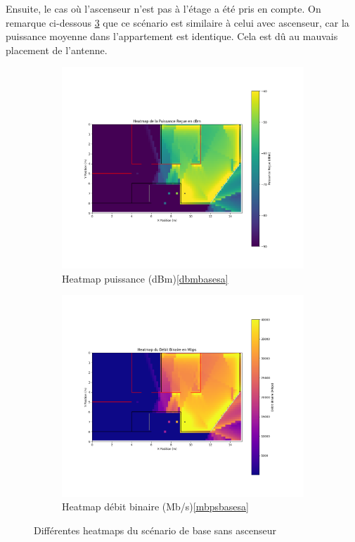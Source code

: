 Ensuite, le cas où l'ascenseur n'est pas à l'étage a été pris en compte. On remarque ci-dessous \ref{okemec} que ce scénario est similaire à celui avec ascenseur, car la puissance moyenne dans l'appartement est identique. Cela est dû au mauvais placement de l'antenne.

\begin{figure}[H]
\centering
\begin{subfigure}[b]{0.48\textwidth}
    \centering
    \includegraphics[width=\textwidth]{Pictures/bpmsa.png}
    \caption{Heatmap puissance (dBm)\ref{dbmbasesa}}
    \label{fig:}
\end{subfigure}
\hfill
\begin{subfigure}[b]{0.48\textwidth}
    \centering
    \includegraphics[width=\textwidth]{Pictures/mbpssa.png}
    \caption{Heatmap débit binaire (Mb/s)\ref{mbpsbasesa}}
    \label{fig:}
\end{subfigure}
\caption{Différentes heatmaps du scénario de base sans ascenseur }
\label{okemec}
\end{figure}

